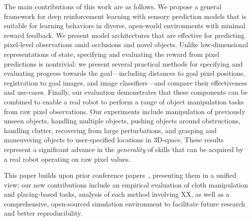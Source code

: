 The main contributions of this work are as follows. We propose a general framework for deep reinforcement learning with sensory prediction models that is suitable for learning behaviors in diverse, open-world environments with minimal reward feedback. 
We present model architectures that are effective for predicting pixel-level observations amid occlusions and novel objects. Unlike low-dimensional representations of state, specifying and evaluating the reward from pixel predictions is nontrivial: we present several practical methods for specifying and evaluating progress towards the goal---including distances to goal pixel positions, registration to goal images, and image classifiers---and compare their effectiveness and use-cases.
Finally, our evaluation demonstrates that these components can be combined to enable a real robot to perform a range of object manipulation tasks from raw pixel observations. Our experiments include manipulation of previously unseen objects, handling multiple objects, pushing objects around obstructions, handling clutter, recovering from large perturbations, and grasping and maneuvering objects to user-specified locations in 3D-space. These results represent a significant advance in the \emph{generality} of skills that can be acquired by a real robot operating on raw pixel values.

This paper builds upon prior conference papers~\cite{foresight,sna,ebert2018robustness,flo}, presenting them in a unified view; our new contributions include an empirical evaluation of cloth manipulation and placing-based tasks, analysis of each method involving XX, as well as a comprehensive, open-sourced simulation environment to facilitate future research and better reproducibility.





 





